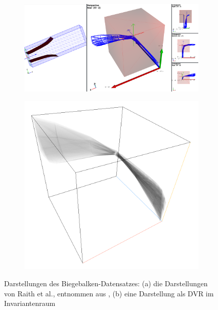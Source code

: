 \documentclass[a4paper,fontsize=12pt,toc=bib,halfparskip]{scrartcl}
\begin{document}
\begin{figure}
	\begin{subfigure}{0.65\textwidth}
		\centering
		\includegraphics[width=\textwidth]{pictures/results/Beam/Beam_Raith.png}
		\subcaption{}
		\label{BeamRaith}
	\end{subfigure}
	\hspace*{\fill}
	\begin{subfigure}{0.34\textwidth}
		\centering
		\includegraphics[width=\textwidth]{pictures/results/Beam/Beam_InvariantSpace.png}
		\subcaption{}
		\label{BeamInvariant}
	\end{subfigure}
	\caption{Darstellungen des Biegebalken-Datensatzes: (a) die Darstellungen von Raith et al., entnommen aus \cite{raith2019tensor}, (b) eine Darstellung als DVR im Invariantenraum}
	\label{Beam}
\end{figure}
\end{document}
